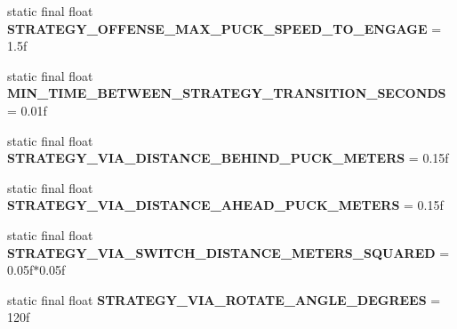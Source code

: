 \begin{DoxyCompactItemize}
\item 
\hypertarget{classairhockeyjava_1_1game_1_1_constants_a4218aabe4f54e2c158f95eca4c9ee173}{}static final float {\bfseries S\+T\+R\+A\+T\+E\+G\+Y\+\_\+\+O\+F\+F\+E\+N\+S\+E\+\_\+\+M\+A\+X\+\_\+\+P\+U\+C\+K\+\_\+\+S\+P\+E\+E\+D\+\_\+\+T\+O\+\_\+\+E\+N\+G\+A\+G\+E} = 1.\+5f\label{classairhockeyjava_1_1game_1_1_constants_a4218aabe4f54e2c158f95eca4c9ee173}

\item 
\hypertarget{classairhockeyjava_1_1game_1_1_constants_ad23fff9d7f67a4f9eae159eb76b38e07}{}static final float {\bfseries M\+I\+N\+\_\+\+T\+I\+M\+E\+\_\+\+B\+E\+T\+W\+E\+E\+N\+\_\+\+S\+T\+R\+A\+T\+E\+G\+Y\+\_\+\+T\+R\+A\+N\+S\+I\+T\+I\+O\+N\+\_\+\+S\+E\+C\+O\+N\+D\+S} = 0.\+01f\label{classairhockeyjava_1_1game_1_1_constants_ad23fff9d7f67a4f9eae159eb76b38e07}

\item 
\hypertarget{classairhockeyjava_1_1game_1_1_constants_aa9fc935b490b852ce6cdd050e0277bcc}{}static final float {\bfseries S\+T\+R\+A\+T\+E\+G\+Y\+\_\+\+V\+I\+A\+\_\+\+D\+I\+S\+T\+A\+N\+C\+E\+\_\+\+B\+E\+H\+I\+N\+D\+\_\+\+P\+U\+C\+K\+\_\+\+M\+E\+T\+E\+R\+S} = 0.\+15f\label{classairhockeyjava_1_1game_1_1_constants_aa9fc935b490b852ce6cdd050e0277bcc}

\item 
\hypertarget{classairhockeyjava_1_1game_1_1_constants_a89085b3dcb675213957fcf447d8abed2}{}static final float {\bfseries S\+T\+R\+A\+T\+E\+G\+Y\+\_\+\+V\+I\+A\+\_\+\+D\+I\+S\+T\+A\+N\+C\+E\+\_\+\+A\+H\+E\+A\+D\+\_\+\+P\+U\+C\+K\+\_\+\+M\+E\+T\+E\+R\+S} = 0.\+15f\label{classairhockeyjava_1_1game_1_1_constants_a89085b3dcb675213957fcf447d8abed2}

\item 
\hypertarget{classairhockeyjava_1_1game_1_1_constants_aeb07e6178e6b42c7d6119f8e5a340d3b}{}static final float {\bfseries S\+T\+R\+A\+T\+E\+G\+Y\+\_\+\+V\+I\+A\+\_\+\+S\+W\+I\+T\+C\+H\+\_\+\+D\+I\+S\+T\+A\+N\+C\+E\+\_\+\+M\+E\+T\+E\+R\+S\+\_\+\+S\+Q\+U\+A\+R\+E\+D} = 0.\+05f$\ast$0.\+05f\label{classairhockeyjava_1_1game_1_1_constants_aeb07e6178e6b42c7d6119f8e5a340d3b}

\item 
\hypertarget{classairhockeyjava_1_1game_1_1_constants_ac8e52ef5135d005af5f74563a75fbb0f}{}static final float {\bfseries S\+T\+R\+A\+T\+E\+G\+Y\+\_\+\+V\+I\+A\+\_\+\+R\+O\+T\+A\+T\+E\+\_\+\+A\+N\+G\+L\+E\+\_\+\+D\+E\+G\+R\+E\+E\+S} = 120f\label{classairhockeyjava_1_1game_1_1_constants_ac8e52ef5135d005af5f74563a75fbb0f}


\end{DoxyCompactItemize}
